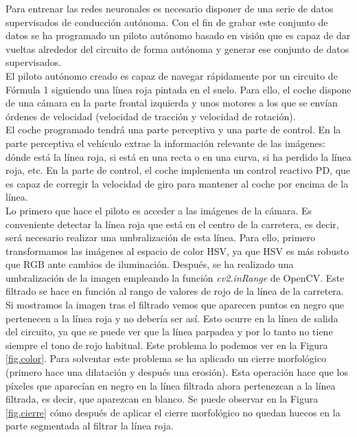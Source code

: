 Para entrenar las redes neuronales es necesario disponer de una serie de datos supervisados de conducción autónoma. Con el fin de grabar este conjunto de datos se ha programado un piloto autónomo basado en visión que es capaz de dar vueltas alrededor del circuito de forma autónoma y generar ese conjunto de datos supervisados. \\

El piloto autónomo creado es capaz de navegar rápidamente por un circuito de Fórmula 1 siguiendo una línea roja pintada en el suelo. Para ello, el coche dispone de una cámara en la parte frontal izquierda y unos motores a los que se envían órdenes de velocidad (velocidad de tracción y velocidad de rotación).\\

El coche programado tendrá una parte perceptiva y una parte de control. En la parte perceptiva el vehículo extrae la información relevante de las imágenes: dónde está la línea roja, si está en una recta o en una curva, si ha perdido la línea roja, etc. En la parte de control, el coche implementa un control reactivo PD, que es capaz de corregir la velocidad de giro para mantener al coche por encima de la línea.\\ 


Lo primero que hace el piloto es acceder a las imágenes de la cámara. Es conveniente detectar la línea roja que está en el centro de la carretera, es decir, será necesario realizar una umbralización de esta línea. Para ello, primero transformamos las imágenes al espacio de color HSV, ya que HSV es más robusto que RGB ante cambios de iluminación. Después, se ha realizado una umbralización de la imagen empleando la función \textit{cv2.inRange} de OpenCV. Este filtrado se hace en función al rango de valores de rojo de la línea de la carretera.\\

Si mostramos la imagen tras el filtrado vemos que aparecen puntos en negro que pertenecen a la línea roja y no debería ser así. Esto ocurre en la línea de salida del circuito, ya que se puede ver que la línea parpadea y por lo tanto no tiene siempre el tono de rojo habitual. Este problema lo podemos ver en la Figura \ref{fig.color}. Para solventar este problema se ha aplicado un cierre morfológico (primero hace una dilatación y después una erosión). Esta operación hace que los píxeles que aparecían en negro en la línea filtrada ahora pertenezcan a la línea filtrada, es decir, que aparezcan en blanco. Se puede observar en la Figura \ref{fig.cierre} cómo después de aplicar el cierre morfológico no quedan huecos en la parte segmentada al filtrar la línea roja.\\

